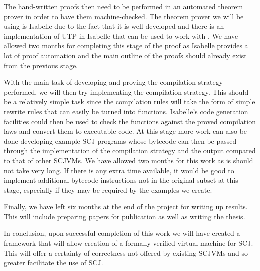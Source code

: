 \documentclass[a4paper,10pt]{report}
\begin{document}
The hand-written proofs then need to be performed in an automated
theorem prover in order to have them machine-checked.
The theorem prover we will be using is Isabelle due to the fact that
it is well developed and there is an implementation of UTP in Isabelle
that can be used to work with \Circus{}.
We have allowed two months for completing this stage of the proof as
Isabelle provides a lot of proof automation and the main outline of
the proofs should already exist from the previous stage.

With the main task of developing and proving the compilation strategy
performed, we will then try implementing the compilation strategy.
This should be a relatively simple task since the compilation rules
will take the form of simple rewrite rules that can easily be turned
into functions.
Isabelle's code generation facilities could then be used to check the
functions against the proved compilation laws and convert them to
executable code.
At this stage more work can also be done developing example SCJ
programs whose bytecode can then be passed through the implementation
of the compilation strategy and the output compared to that of other
SCJVMs.
We have allowed two months for this work as is should not take very
long.
If there is any extra time available, it would be good to implement
additional bytecode instructions not in the original subset at this
stage, especially if they may be required by the examples we create.

Finally, we have left six months at the end of the project for writing
up results.
This will include preparing papers for publication as well as writing
the thesis.

In conclusion, upon successful completion of this work we will have
created a framework that will allow creation of a formally verified
virtual machine for SCJ.
This will offer a certainty of correctness not offered by existing
SCJVMs and so greater facilitate the use of SCJ.


\printbibliography
\end{document}
